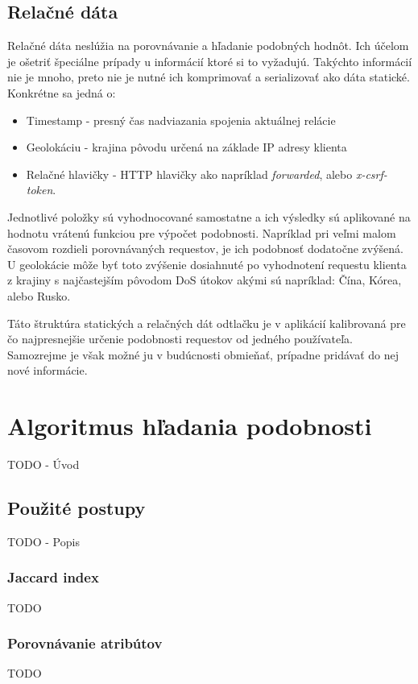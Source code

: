 \documentclass[
  printed, %
  table,   %
  lof,     %
  lot,     %
]{fithesis3}
\begin{document}
\subsection{Relačné dáta}
Relačné dáta neslúžia na porovnávanie a hľadanie podobných hodnôt. Ich účelom
je ošetriť špeciálne prípady u informácií ktoré si to vyžadujú. Takýchto
informácií nie je mnoho, preto nie je nutné ich komprimovať a serializovať ako
dáta statické.
Konkrétne sa jedná o:
\begin{itemize}
    \item Timestamp - presný čas nadviazania spojenia aktuálnej relácie
    \item Geolokáciu - krajina pôvodu určená na základe IP adresy klienta
    \item Relačné hlavičky - HTTP hlavičky ako napríklad
    \textit{forwarded}, alebo \textit{x-csrf-token}. 
\end{itemize}

Jednotlivé položky sú vyhodnocované samostatne a ich výsledky sú aplikované na
hodnotu vrátenú funkciou pre výpočet podobnosti. Napríklad pri veľmi malom
časovom rozdieli porovnávaných requestov, je ich podobnosť dodatočne zvýšená. U
geolokácie môže byť toto zvýšenie dosiahnuté po vyhodnotení requestu klienta z
krajiny s najčastejším pôvodom DoS útokov akými sú napríklad: Čína, Kórea, alebo
Rusko.

Táto štruktúra statických a relačných dát odtlačku je v aplikácií kalibrovaná
pre čo najpresnejšie určenie podobnosti requestov od jedného používateľa.
Samozrejme je však možné ju v budúcnosti obmieňať, prípadne pridávať do nej
nové informácie.

\section{Algoritmus hľadania podobnosti}
TODO - Úvod

\subsection{Použité postupy}
TODO - Popis

\subsubsection{Jaccard index}
TODO

\subsubsection{Porovnávanie atribútov}
TODO
\end{document}
